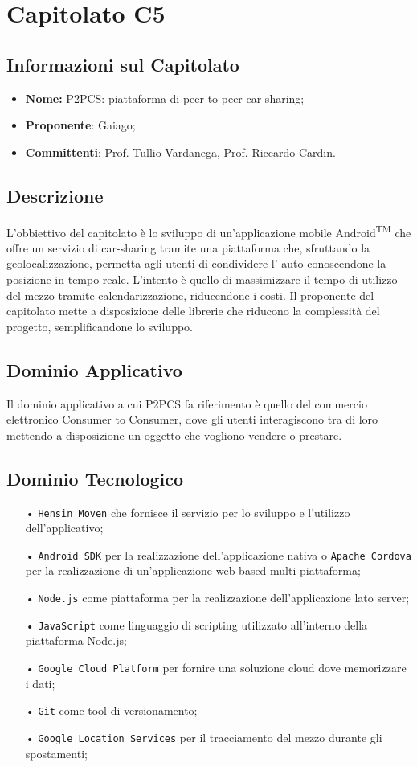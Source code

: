 \section{Capitolato C5}
\subsection{Informazioni sul Capitolato}
\begin{itemize}
	\item \textbf{Nome:} P2PCS: piattaforma di peer-to-peer car sharing;
	\item \textbf{Proponente}: Gaiago;
	\item \textbf{Committenti}: Prof. Tullio Vardanega, Prof. Riccardo Cardin.
\end{itemize}
\subsection{Descrizione}
L'obbiettivo del capitolato è lo sviluppo di un'applicazione mobile Android\textsuperscript{TM} che offre un servizio di 
car-sharing tramite una piattaforma che, sfruttando la geolocalizzazione, permetta agli utenti di condividere l' auto conoscendone la posizione in tempo reale. 
L'intento è quello di massimizzare il tempo di utilizzo del mezzo tramite calendarizzazione, 
riducendone i costi. 
Il proponente del capitolato mette a disposizione delle librerie che riducono la 
complessità del progetto, semplificandone lo sviluppo.

\subsection{Dominio Applicativo}
Il dominio applicativo a cui P2PCS fa riferimento è quello del commercio elettronico Consumer to Consumer, dove gli utenti interagiscono tra di loro mettendo a disposizione un oggetto che vogliono vendere o prestare.

\subsection{Dominio Tecnologico}
\begin{itemize}
\item[•] \texttt{Hensin Moven} che fornisce il servizio per lo sviluppo e l'utilizzo dell'applicativo;
\item[•] \texttt{Android SDK} per la realizzazione dell'applicazione nativa o \texttt{Apache Cordova} per
 la realizzazione di un'applicazione web-based multi-piattaforma;
\item[•] \texttt{Node.js} come piattaforma per la realizzazione dell'applicazione lato server;
\item[•] \texttt{JavaScript} come linguaggio di scripting utilizzato all'interno della piattaforma Node.js;
\item[•] \texttt{Google Cloud Platform} per fornire una soluzione cloud dove memorizzare i dati;
\item[•] \texttt{Git} come tool di versionamento;
\item[•] \texttt{Google Location Services} per il tracciamento del mezzo durante gli spostamenti;
\end{itemize}

